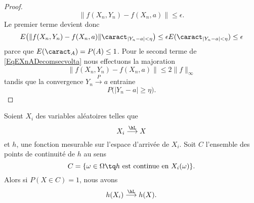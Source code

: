 \begin{proof}
\begin{equation}
        \| f(X_n,Y_n)-f(X_n,a) \|\leq \epsilon.
    \end{equation}
    Le premier terme devient donc
    \begin{equation}
        E\big( \| f(X_n,Y_n)-f(X_n,a) \|\caract_{| Y_n-a |<\eta} \big)\leq \epsilon E(\caract_{| Y_n-a |<\eta})\leq \epsilon
    \end{equation}
    parce que \( E(\caract_A)=P(A)\leq 1\). Pour le second terme de \eqref{EqEXnADecomsecvolta} nous effectuons la majoration
    \begin{equation}
        \| f(X_n,Y_n)-f(X_n,a) \|\leq 2\| f \|_{\infty}
    \end{equation}
    tandis que la convergence \( Y_n\stackrel{P}{\longrightarrow} a\) entraine 
    \begin{equation}
        P\big( | Y_n-a |\geq \eta \big).
    \end{equation}
\end{proof}

\begin{proposition}     \label{PropcvLsousfonc}
    Soient \( X_i\) des variables aléatoires telles que
    \begin{equation}
        X_i\stackrel{\hL}{\longrightarrow} X
    \end{equation}
    et \( h\), une fonction mesurable sur l'espace d'arrivée de \( X_i\). Soit \( C\) l'ensemble des points de continuité de \( h\) au sens
    \begin{equation}
        C=\{ \omega\in\Omega\tq \text{\( h\) est continue en \( X_i(\omega)\)} \}.
    \end{equation}
    Alors si \( P(X\in C)=1\), nous avons 
    \begin{equation}
        h(X_i)\stackrel{\hL}{\longrightarrow}h(X).
    \end{equation}
\end{proposition}

